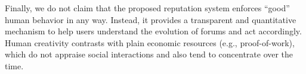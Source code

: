 \documentclass[12pt]{article}
\newcommand{\reps}     {\emph{reps}\xspace}
\begin{document}
Finally, we do not claim that the proposed reputation system enforces ``good''
human behavior in any way.
Instead, it provides a transparent and quantitative mechanism to help users
understand the evolution of forums and act accordingly.
Human creativity contrasts with plain economic resources (e.g.,
proof-of-work), which do not appraise social interactions and also tend
to concentrate over the time.
%

\end{document}
